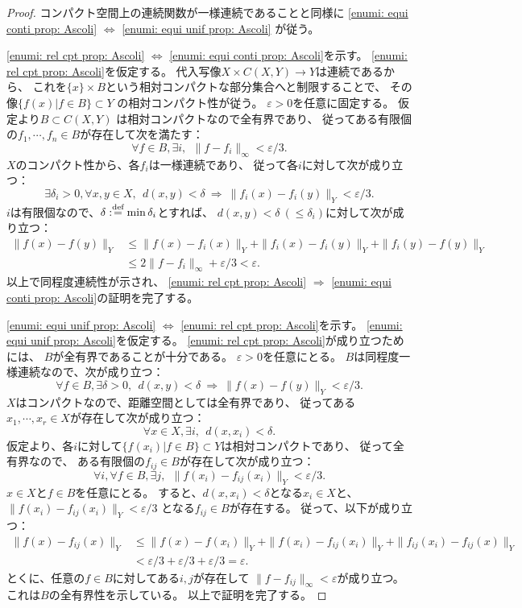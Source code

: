 \documentclass[uplatex]{jsarticle}
\theoremstyle{definition}
\newcommand{\ep}{\varepsilon}
\newcommand{\dfn}{:\overset{\mbox{{\scriptsize def}}}{=}}
\begin{document}
\begin{proof}
  コンパクト空間上の連続関数が一様連続であることと同様に
  \ref{enumi: equi conti prop: Ascoli} \(\iff\)
  \ref{enumi: equi unif prop: Ascoli}
  が従う。

  \ref{enumi: rel cpt prop: Ascoli} \(\iff\)
  \ref{enumi: equi conti prop: Ascoli}を示す。
  \ref{enumi: rel cpt prop: Ascoli}を仮定する。
  代入写像\(X\times C(X,Y)\to Y\)は連続であるから、
  これを\(\{x\}\times B\)という相対コンパクトな部分集合へと制限することで、
  その像\(\{f(x) | f\in B\}\subset Y\)
  の相対コンパクト性が従う。
  \(\ep > 0\)を任意に固定する。
  仮定より\(B\subset C(X,Y)\)
  は相対コンパクトなので全有界であり、
  従ってある有限個の\(f_1,\cdots, f_n\in B\)が存在して次を満たす：
  \[\forall f\in B, \exists i, \ \ \|f-f_i\|_{\infty} < \ep/3.\]
  \(X\)のコンパクト性から、各\(f_i\)は一様連続であり、
  従って各\(i\)に対して次が成り立つ：
  \[\exists \delta_i>0, \forall x,y\in X, \ \
  d(x,y) < \delta \ \Rightarrow \ \|f_i(x) - f_i(y)\|_Y < \ep/3.\]
  \(i\)は有限個なので、\(\delta \dfn \min \delta_i\)とすれば、
  \(d(x,y)<\delta \ (\leq \delta_i)\)に対して次が成り立つ：
  \begin{align*}
    \|f(x) - f(y)\|_Y
    &\leq \| f(x) - f_i(x)\|_Y +
    \| f_i(x) - f_i(y)\|_Y +
    \| f_i(y) - f(y)\|_Y \\
    &\leq 2\| f - f_i\|_{\infty} + \ep/3 < \ep.
  \end{align*}
  以上で同程度連続性が示され、
  \ref{enumi: rel cpt prop: Ascoli} \(\Rightarrow\)
  \ref{enumi: equi conti prop: Ascoli}の証明を完了する。

  \ref{enumi: equi unif prop: Ascoli} \(\iff\)
  \ref{enumi: rel cpt prop: Ascoli}を示す。
  \ref{enumi: equi unif prop: Ascoli}を仮定する。
  \ref{enumi: rel cpt prop: Ascoli}が成り立つためには、
  \(B\)が全有界であることが十分である。
  \(\ep > 0\)を任意にとる。
  \(B\)は同程度一様連続なので、次が成り立つ：
  \[
  \forall f\in B, \exists \delta > 0, \ \
  d(x,y) < \delta \ \Rightarrow \ \| f(x) - f(y)\|_Y < \ep/3.
  \]
  \(X\)はコンパクトなので、距離空間としては全有界であり、
  従ってある\(x_1,\cdots,x_r\in X\)が存在して次が成り立つ：
  \[
  \forall x\in X, \exists i, \ \ d(x,x_i) < \delta.
  \]
  仮定より、各\(i\)に対して\(\{f(x_i)|f\in B\}\subset Y\)は相対コンパクトであり、
  従って全有界なので、
  ある有限個の\(f_{ij}\in B\)が存在して次が成り立つ：
  \[
  \forall i, \forall f\in B, \exists j, \ \
  \| f(x_i) - f_{ij}(x_i)\|_Y < \ep/3.
  \]
  \(x\in X\)と\(f\in B\)を任意にとる。
  すると、\(d(x,x_i) < \delta\)となる\(x_i\in X\)と、
  \(\| f(x_i) - f_{ij}(x_i)\|_Y < \ep/3\)
  となる\(f_{ij}\in B\)が存在する。
  従って、以下が成り立つ：
  \begin{align*}
    \|f(x)-f_{ij}(x)\|_Y
    &\leq \| f(x) - f(x_i) \|_Y + \| f(x_i) - f_{ij}(x_i)\|_Y + \| f_{ij}(x_i) - f_{ij}(x)\|_Y \\
    &< \ep/3 + \ep/3 + \ep/3 = \ep.
  \end{align*}
  とくに、任意の\(f\in B\)に対してある\(i,j\)が存在して
  \(\|f-f_{ij}\|_{\infty} < \ep\)が成り立つ。
  これは\(B\)の全有界性を示している。
  以上で証明を完了する。
\end{proof}
\end{document}
